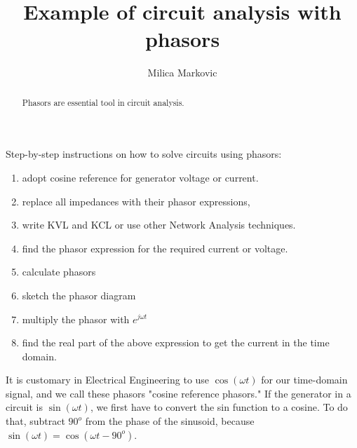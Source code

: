 \documentclass{ximera}
\title{Example of circuit analysis with phasors}
\author{Milica Markovic}
\begin{document}
  
\begin{abstract}  
Phasors are essential tool in circuit analysis.
\end{abstract}  
\maketitle    




 Step-by-step instructions on how to solve circuits using phasors:
\begin{enumerate}
\item adopt cosine reference for generator voltage or current. 
\item replace all impedances with their phasor expressions,
\item write KVL and KCL or use other Network Analysis techniques.
\item find the phasor expression for the required current or voltage. 
\item calculate phasors 
\item sketch the phasor diagram
\item multiply the phasor with $e^{j \omega t}$  
\item find the real part of the above expression to get the current in the time domain.
\end{enumerate}


It is customary in Electrical Engineering to use  $\cos( \omega t)$ for our time-domain signal, and we call these phasors "cosine reference phasors."  If the generator in a circuit is  $\sin (\omega t)$, we first have to convert the sin function to a cosine. To do that, subtract $90^o$ from the phase of the sinusoid, because $\sin( \omega t) = \cos(\omega t - 90^o)$.
\end{document}

